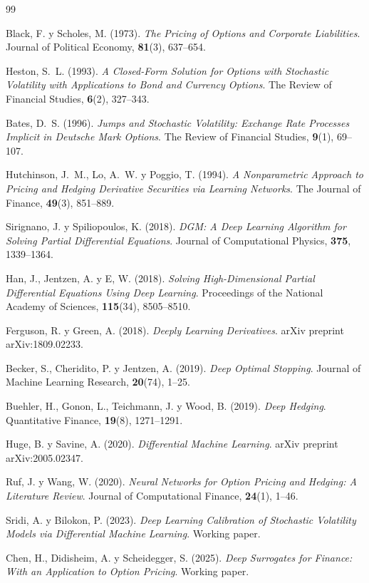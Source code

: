 \documentclass[11pt,a4paper]{article}
\begin{document}
\begin{thebibliography}{99}
\footnotesize
\setlength{\itemsep}{0.15em}
\setlength{\parskip}{0pt}

Black, F. y Scholes, M. (1973).
\textit{The Pricing of Options and Corporate Liabilities}.
Journal of Political Economy, \textbf{81}(3), 637--654.

Heston, S.~L. (1993).
\textit{A Closed-Form Solution for Options with Stochastic Volatility with Applications to Bond and Currency Options}.
The Review of Financial Studies, \textbf{6}(2), 327--343.

Bates, D.~S. (1996).
\textit{Jumps and Stochastic Volatility: Exchange Rate Processes Implicit in Deutsche Mark Options}.
The Review of Financial Studies, \textbf{9}(1), 69--107.

Hutchinson, J.~M., Lo, A.~W. y Poggio, T. (1994).
\textit{A Nonparametric Approach to Pricing and Hedging Derivative Securities via Learning Networks}.
The Journal of Finance, \textbf{49}(3), 851--889.

Sirignano, J. y Spiliopoulos, K. (2018).
\textit{DGM: A Deep Learning Algorithm for Solving Partial Differential Equations}.
Journal of Computational Physics, \textbf{375}, 1339--1364.

Han, J., Jentzen, A. y E, W. (2018).
\textit{Solving High-Dimensional Partial Differential Equations Using Deep Learning}.
Proceedings of the National Academy of Sciences, \textbf{115}(34), 8505--8510.

Ferguson, R. y Green, A. (2018).
\textit{Deeply Learning Derivatives}.
arXiv preprint arXiv:1809.02233.

Becker, S., Cheridito, P. y Jentzen, A. (2019).
\textit{Deep Optimal Stopping}.
Journal of Machine Learning Research, \textbf{20}(74), 1--25.

Buehler, H., Gonon, L., Teichmann, J. y Wood, B. (2019).
\textit{Deep Hedging}.
Quantitative Finance, \textbf{19}(8), 1271--1291.

Huge, B. y Savine, A. (2020).
\textit{Differential Machine Learning}.
arXiv preprint arXiv:2005.02347.

Ruf, J. y Wang, W. (2020).
\textit{Neural Networks for Option Pricing and Hedging: A Literature Review}.
Journal of Computational Finance, \textbf{24}(1), 1--46.

Sridi, A. y Bilokon, P. (2023).
\textit{Deep Learning Calibration of Stochastic Volatility Models via Differential Machine Learning}.
Working paper.

Chen, H., Didisheim, A. y Scheidegger, S. (2025).
\textit{Deep Surrogates for Finance: With an Application to Option Pricing}.
Working paper.

\end{thebibliography}
\end{document}
